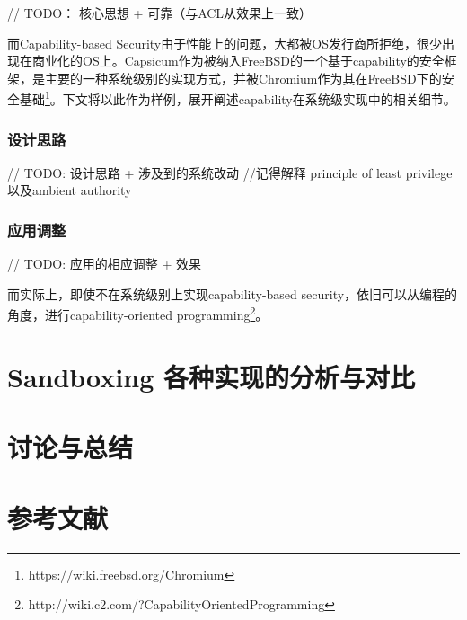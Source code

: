 \documentclass[preprint,12pt]{elsarticle}
\begin{document}
// TODO： 核心思想 + 可靠（与ACL从效果上一致）

而Capability-based Security由于性能上的问题，大都被OS发行商所拒绝，很少出现在商业化的OS上。Capsicum\cite{capasicum}作为被纳入FreeBSD的一个基于capability的安全框架，是主要的一种系统级别的实现方式，并被Chromium作为其在FreeBSD下的安全基础\footnote{https://wiki.freebsd.org/Chromium}。下文将以此作为样例，展开阐述capability在系统级实现中的相关细节。

\subsubsection{设计思路}
\label{sss:design}

// TODO: 设计思路 + 涉及到的系统改动
//记得解释 principle of least privilege以及ambient authority

\subsubsection{应用调整}
\label{sss:adoption}

// TODO: 应用的相应调整 + 效果

而实际上，即使不在系统级别上实现capability-based security，依旧可以从编程的角度，进行capability-oriented programming\footnote{http://wiki.c2.com/?CapabilityOrientedProgramming}。

\section{Sandboxing 各种实现的分析与对比}
\label{s:evaluation}

\section{讨论与总结}
\label{s:tucao}








\section*{参考文献}

 

\end{document}
